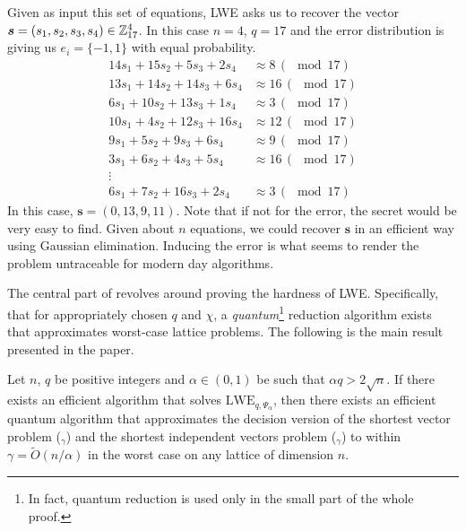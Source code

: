 \begin{example}\label{lwe_ex}
    Given as input this set of equations, LWE asks us to recover the vector $\boldsymbol{s} = (s_1, s_2, s_3, s_4) \in \mathbb{Z}_{17}^4$. In this case $n = 4$, $q=17$ and the error distribution is giving us $e_i = \{-1, 1\}$ with equal probability. 
\begin{align*}
    14s_1 + 15s_2 +5s_3 + 2s_4 & \approx 8 \, (\mod 17)\\
    13s_1 + 14s_2 + 14s_3 + 6s_4 & \approx 16\, (\mod 17) \\
    6s_1 + 10s_2 + 13s_3 + 1s_4 & \approx 3\, (\mod 17) \\
    10s_1 + 4s_2 + 12s_3 + 16s_4 & \approx 12\, (\mod 17) \\
    9s_1 + 5s_2 + 9s_3 +6s_4 & \approx 9\, (\mod 17) \\
    3s_1 + 6s_2 +4s_3 +5s_4 & \approx 16\, (\mod 17) \\
    \vdots & \\
    6s_1 + 7s_2 + 16s_3 + 2s_4 & \approx 3\, (\mod 17)
\end{align*}
In this case, $\bm{s} = (0, 13, 9, 11)$. Note that if not for the error, the secret would be very easy to find. Given about $n$ equations, we could recover $\bm{s}$ in an efficient way using Gaussian elimination. Inducing the error is what seems to render the problem untraceable for modern day algorithms.
\end{example}
The central part of \cite{regev} revolves around proving the hardness of LWE. Specifically, that for appropriately chosen $q$ and $\chi$, a \textit{quantum}\footnote{In fact, quantum reduction is used only in the small part of the whole proof.} reduction algorithm exists that approximates worst-case lattice problems. The following is the main result presented in the paper. 

\begin{theorem}\label{main}
	Let $n$, $q$ be positive integers and $\alpha \in (0, 1)$ be such that $\alpha q > 2 \sqrt{n}$. If there exists an efficient algorithm that solves $\text{LWE}_{q, \Psi_{\alpha}}$, then there exists an efficient quantum algorithm that approximates the decision version of the shortest vector problem ($_{\gamma}$) and the shortest independent vectors problem ($_{\gamma}$) to within $\gamma = \tilde{O}(n/\alpha)$ in the worst case on any lattice of dimension $n$.	
\end{theorem}

